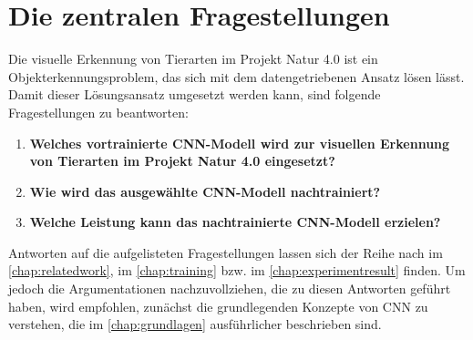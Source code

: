 \section{Die zentralen Fragestellungen}

Die visuelle Erkennung von Tierarten im Projekt Natur 4.0 ist ein Objekterkennungsproblem, das sich mit dem datengetriebenen Ansatz lösen lässt. Damit dieser Lösungsansatz umgesetzt werden kann, sind folgende Fragestellungen zu beantworten:

\begin{enumerate}
	\item \textbf{Welches vortrainierte CNN-Modell wird zur visuellen Erkennung von Tierarten im Projekt Natur 4.0 eingesetzt?}
	
	\item \textbf{Wie wird das ausgewählte CNN-Modell nachtrainiert?}
	
	\item \textbf{Welche Leistung kann das nachtrainierte CNN-Modell erzielen?}
\end{enumerate}

Antworten auf die aufgelisteten Fragestellungen lassen sich der Reihe nach im \autoref{chap:relatedwork}, im \autoref{chap:training} bzw. im \autoref{chap:experimentresult} finden. Um jedoch die Argumentationen nachzuvollziehen, die zu diesen Antworten geführt haben, wird empfohlen, zunächst die grundlegenden Konzepte von CNN zu verstehen, die im \autoref{chap:grundlagen} ausführlicher beschrieben sind.